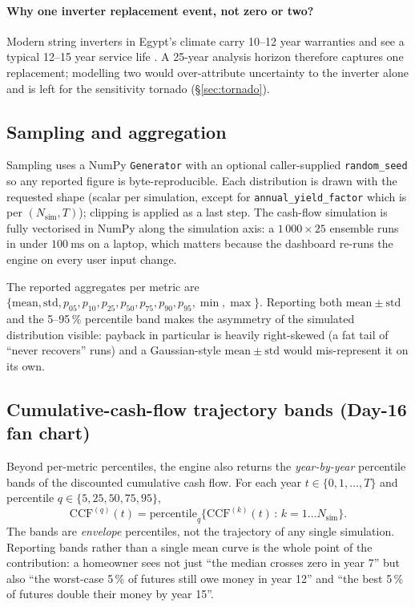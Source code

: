 \paragraph{Why one inverter replacement event, not zero or two?}
Modern string inverters in Egypt's climate carry 10--12 year
warranties and see a typical 12--15 year service life
\citep{ieapvps2021}. A 25-year analysis horizon therefore captures
one replacement; modelling two would over-attribute uncertainty to
the inverter alone and is left for the sensitivity tornado
(\S\ref{sec:tornado}).

\subsection{Sampling and aggregation}

Sampling uses a NumPy \texttt{Generator} with an optional
caller-supplied \texttt{random\_seed} so any reported figure is
byte-reproducible. Each distribution is drawn with the requested
shape (scalar per simulation, except for
\texttt{annual\_yield\_factor} which is per
$(N_{\text{sim}}, T)$); clipping is applied as a last step. The
cash-flow simulation is fully vectorised in NumPy along the
simulation axis: a $1\,000\times25$ ensemble runs in under
$100~\mathrm{ms}$ on a laptop, which matters because the dashboard
re-runs the engine on every user input change.

The reported aggregates per metric are
$\{\mathrm{mean}, \mathrm{std}, p_{05}, p_{10}, p_{25}, p_{50},
p_{75}, p_{90}, p_{95}, \min, \max\}$. Reporting both
$\mathrm{mean} \pm \mathrm{std}$ and the 5--95\,\% percentile band
makes the asymmetry of the simulated distribution visible: payback in
particular is heavily right-skewed (a fat tail of ``never recovers''
runs) and a Gaussian-style $\mathrm{mean} \pm \mathrm{std}$ would
mis-represent it on its own.

\subsection{Cumulative-cash-flow trajectory bands (Day-16 fan chart)}

Beyond per-metric percentiles, the engine also returns the
\emph{year-by-year} percentile bands of the discounted cumulative
cash flow. For each year $t \in \{0, 1, \dots, T\}$ and percentile
$q \in \{5, 25, 50, 75, 95\}$,
\begin{equation}
\mathrm{CCF}^{(q)}(t) =
   \mathrm{percentile}_q
   \bigl\{ \mathrm{CCF}^{(k)}(t) \,:\, k = 1\dots N_{\text{sim}}\bigr\}.
\label{eq:fanchart}
\end{equation}
The bands are \emph{envelope} percentiles, not the trajectory of any
single simulation. Reporting bands rather than a single mean curve is
the whole point of the contribution: a homeowner sees not just ``the
median crosses zero in year 7'' but also ``the worst-case 5\,\% of
futures still owe money in year 12'' and ``the best 5\,\% of futures
double their money by year 15''.

